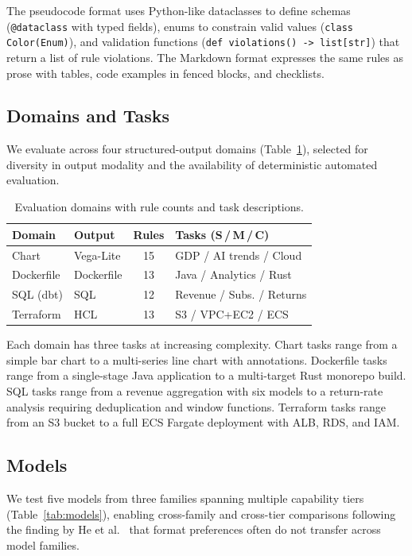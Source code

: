 \documentclass[sigconf,nonacm]{acmart}
\begin{document}
The pseudocode format uses Python-like dataclasses to define schemas
(\texttt{@dataclass} with typed fields), enums to constrain valid values
(\texttt{class Color(Enum)}), and validation functions
(\texttt{def violations() -> list[str]}) that return a list of rule
violations. The Markdown format expresses the same rules as prose with
tables, code examples in fenced blocks, and checklists.

\subsection{Domains and Tasks}\label{sec:domains}

We evaluate across four structured-output domains (Table~\ref{tab:domains}),
selected for diversity in output modality and the availability of deterministic
automated evaluation.

\begin{table}[t]
\caption{Evaluation domains with rule counts and task descriptions.}
\label{tab:domains}
\centering\small
\begin{tabular}{llcl}
\toprule
\textbf{Domain} & \textbf{Output} & \textbf{Rules} & \textbf{Tasks (S\,/\,M\,/\,C)} \\
\midrule
Chart & Vega-Lite & 15 & GDP / AI trends / Cloud \\
Dockerfile & Dockerfile & 13 & Java / Analytics / Rust \\
SQL (dbt) & SQL & 12 & Revenue / Subs. / Returns \\
Terraform & HCL & 13 & S3 / VPC+EC2 / ECS \\
\bottomrule
\end{tabular}
\end{table}

Each domain has three tasks at increasing complexity. Chart tasks range from a
simple bar chart to a multi-series line chart with annotations. Dockerfile
tasks range from a single-stage Java application to a multi-target Rust
monorepo build. SQL tasks range from a
revenue aggregation with six models to a return-rate analysis requiring
deduplication and window functions. Terraform tasks range from an S3 bucket to
a full ECS Fargate deployment with ALB, RDS, and IAM.

\subsection{Models}\label{sec:models}

We test five models from three families spanning multiple capability tiers
(Table~\ref{tab:models}), enabling cross-family and cross-tier comparisons
following the finding by He et al.~\cite{he2024prompt} that format preferences
often do not transfer across model families.
\end{document}
